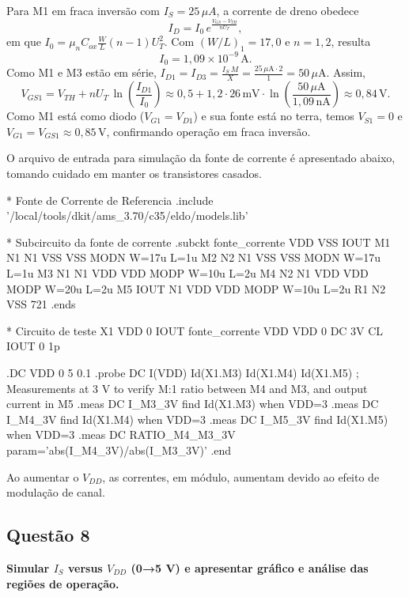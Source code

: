 ﻿\documentclass[12pt,a4paper]{article}
\begin{document}
Para M1 em fraca inversão com $I_S = 25\,\mu A$, a corrente de dreno obedece
\begin{equation}
I_D = I_0\, e^{\frac{V_{GS} - V_{TH}}{nU_T}},
\end{equation}
em que $I_0 = \mu_n C_{ox} \tfrac{W}{L} (n-1)U_T^2$. Com $(W/L)_1=17{,}0$ e $n=1{,}2$, resulta
\begin{equation*}
I_0 = 1{,}09 \times 10^{-9}\,\text{A}.
\end{equation*}
Como M1 e M3 estão em série, $I_{D1}=I_{D3}=\tfrac{I_S\,M}{X}=\tfrac{25\,\mu\text{A}\cdot 2}{1}=50\,\mu\text{A}$. Assim,
\begin{equation*}
V_{GS1} = V_{TH} + nU_T\,\ln\!\left(\frac{I_{D1}}{I_0}\right) \approx 0{,}5 + 1{,}2\cdot 26\,\text{mV}\cdot \ln\!\left(\frac{50\,\mu\text{A}}{1{,}09\,\text{nA}}\right) \approx 0{,}84\,\text{V}.
\end{equation*}
Como M1 está como diodo ($V_{G1}=V_{D1}$) e sua fonte está no terra, temos $V_{S1}=0$ e $V_{G1}=V_{GS1}\approx 0{,}85\,\text{V}$, confirmando operação em fraca inversão.

O arquivo de entrada para simulação da fonte de corrente é apresentado abaixo, tomando cuidado em manter os transistores casados.

\begin{codeblock}[title={Arquivo de simulação da fonte de corrente}]
* Fonte de Corrente de Referencia
.include '/local/tools/dkit/ams_3.70/c35/eldo/models.lib'

* Subcircuito da fonte de corrente
.subckt fonte_corrente VDD VSS IOUT
M1 N1 N1 VSS VSS MODN W=17u L=1u
M2 N2 N1 VSS VSS MODN W=17u L=1u
M3 N1 N1 VDD VDD MODP W=10u L=2u
M4 N2 N1 VDD VDD MODP W=20u L=2u
M5 IOUT N1 VDD VDD MODP W=10u L=2u
R1 N2 VSS 721
.ends

* Circuito de teste
X1 VDD 0 IOUT fonte_corrente
VDD VDD 0 DC 3V
CL IOUT 0 1p

.DC VDD 0 5 0.1
.probe DC I(VDD) Id(X1.M3) Id(X1.M4) Id(X1.M5)
; Measurements at 3 V to verify M:1 ratio between M4 and M3, and output current in M5
.meas DC I_M3_3V find Id(X1.M3) when VDD=3
.meas DC I_M4_3V find Id(X1.M4) when VDD=3
.meas DC I_M5_3V find Id(X1.M5) when VDD=3
.meas DC RATIO_M4_M3_3V param='abs(I_M4_3V)/abs(I_M3_3V)'
.end
\end{codeblock}

Ao aumentar o $V_{DD}$, as correntes, em módulo, aumentam devido ao efeito de modulação de canal.

\subsection*{Questão 8}
	\textbf{Simular $I_S$ versus $V_{DD}$ (0→5 V) e apresentar gráfico e análise das regiões de operação.}
\end{document}
